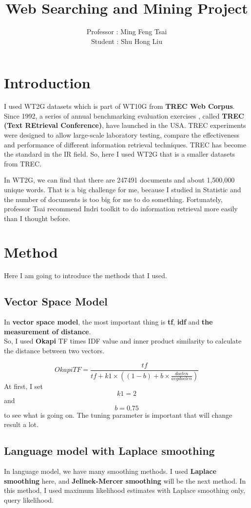 \documentclass[a4pper,11pt,onecolumn]{article}
\title{Web Searching and Mining Project}
\author{Professor : Ming Feng Tsai\\
        Student : Shu Hong Liu}
\begin{document}
\maketitle

\newpage

\tableofcontents
\newpage
\listoffigures
\newpage

\section{Introduction}
I used WT2G datasets which is part of WT10G from \textbf{TREC Web Corpus}.
Since 1992, a series of annual benchmarking evaluation exercises , called \textbf{TREC (Text REtrieval Conference)}, have launched in the USA. TREC experiments were designed to allow large-scale laboratory testing, compare the effectiveness and performance of different information retrieval techniques. TREC has become the standard in the IR field. So, here I used WT2G that is a smaller datasets from TREC.

In WT2G, we can find that there are 247491 documents and about 1,500,000 unique words. That is a big challenge for me, because I studied in Statistic and the number of documents is too big for me to do something. Fortunately, professor Tsai recommend Indri toolkit to do information retrieval more easily than I thought before.

\section{Method}
Here I am going to introduce the methods that I used.

\subsection{Vector Space Model}
In \textbf{vector space model}, the most important thing is \textbf{tf}, \textbf{idf} and \textbf{the measurement of distance}.\\
So, I used \textbf{Okapi} TF times IDF value and inner product similarity to calculate the distance between two vectors.

\[
    Okapi TF = \frac{tf}{tf + k1 \times ((1 - b) + b \times \frac{doclen}{avgdoclen})}
\]
At first, I set$$k1 = 2$$ and \[b = 0.75\] to see what is going on. The tuning parameter is important that will change result a lot.

\subsection{Language model with Laplace smoothing}
In language model, we have many smoothing methods. I used \textbf{Laplace smoothing} here, and \textbf{Jelinek-Mercer smoothing} will be the next method. In this method, I used maximum likelihood estimates with Laplace smoothing only, query likelihood.
\end{document}
